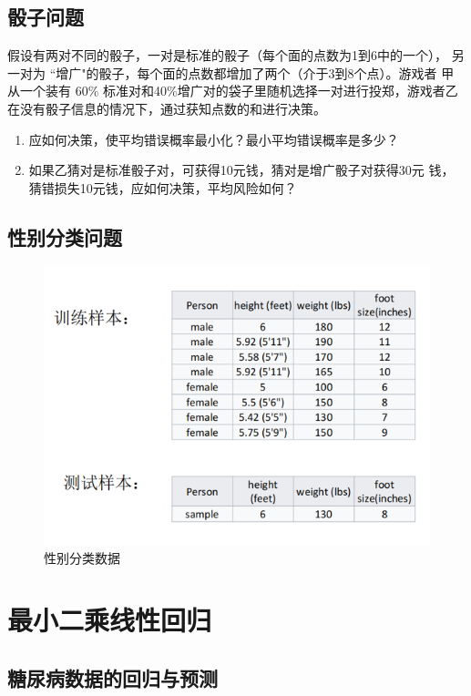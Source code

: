 \documentclass[a4paper,UTF8,openany]{book}
\begin{document}
\section{骰子问题}
假设有两对不同的骰子，一对是标准的骰子（每个面的点数为1到6中的一个）， 另一对为 “增广"的骰子，每个面的点数都增加了两个（介于3到8个点）。游戏者 甲从一个装有 $60 \%$ 标准对和40\%增广对的袋子里随机选择一对进行投郑，游戏者乙 在没有骰子信息的情况下，通过获知点数的和进行决策。\\
\begin{enumerate}
	\item 应如何决策，使平均错误概率最小化？最小平均错误概率是多少？
	\item 如果乙猜对是标准骰子对，可获得10元钱，猜对是增广骰子对获得30元 钱，猜错损失10元钱，应如何决策，平均风险如何？
\end{enumerate}

\section{性别分类问题}
\begin{figure}[ht]

	\centering
	\includegraphics[width=\textwidth]{pic/sex.png}
	\caption{性别分类数据}
	\label{fig:label}
\end{figure}
\chapter{最小二乘线性回归}
\section{糖尿病数据的回归与预测}
\end{document}
